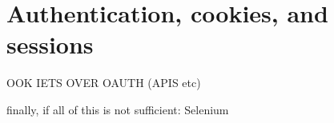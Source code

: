 \section{Authentication, cookies, and sessions}
\label{sec:authentication}



OOK IETS OVER OAUTH (APIS etc)


finally, if all of this is not sufficient: Selenium 
